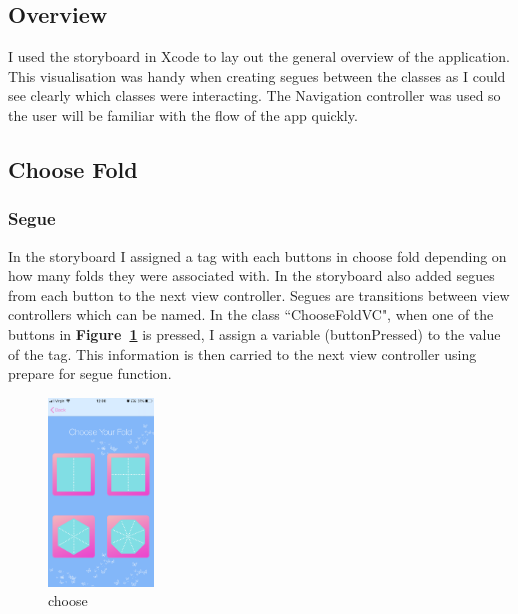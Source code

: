 \documentclass[11pt]{article}
\begin{document}
    
    \subsection{Overview}  
    I used the storyboard in Xcode to lay out the general overview of the application. This visualisation was handy when creating segues between the classes as I could see clearly which classes were interacting. The Navigation controller was used so the user will be familiar with the flow of the app quickly.
    
            \subsection{Choose Fold}
                    
            \subsubsection{Segue}
            In the storyboard I assigned a tag with each buttons in choose fold depending on how many folds they were associated with. In the storyboard also added segues from each button to the next view controller. Segues are transitions between view controllers which can be named. In the class ``ChooseFoldVC", when one of the buttons in \textbf{Figure~\ref{fig:kiriZen-chooseFold}} is pressed, I assign a variable (buttonPressed) to the value of the tag. This information is then carried to the next view controller using prepare for segue function.
            
                         \begin{figure}
                        \centering
                        \includegraphics[width=0.25\textwidth]{KiriZen/chooseFold.png}
                        \caption{choose}
                        \label{fig:kiriZen-chooseFold}
                    \end{figure}
                    
\end{document}

